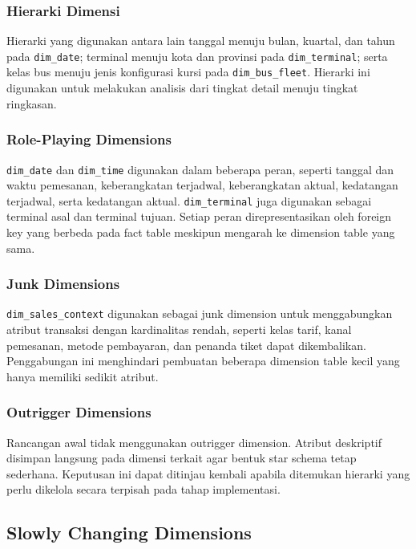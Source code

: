 \subsubsection{Hierarki Dimensi}

Hierarki yang digunakan antara lain tanggal menuju bulan, kuartal, dan tahun pada
\texttt{dim\_date}; terminal menuju kota dan provinsi pada
\texttt{dim\_terminal}; serta kelas bus menuju jenis konfigurasi kursi pada
\texttt{dim\_bus\_fleet}. Hierarki ini digunakan untuk melakukan analisis dari
tingkat detail menuju tingkat ringkasan.

\subsubsection{Role-Playing Dimensions}

\texttt{dim\_date} dan \texttt{dim\_time} digunakan dalam beberapa peran, seperti
tanggal dan waktu pemesanan, keberangkatan terjadwal, keberangkatan aktual,
kedatangan terjadwal, serta kedatangan aktual. \texttt{dim\_terminal} juga digunakan
sebagai terminal asal dan terminal tujuan. Setiap peran direpresentasikan oleh
foreign key yang berbeda pada fact table meskipun mengarah ke dimension table yang
sama.

\subsubsection{Junk Dimensions}

\texttt{dim\_sales\_context} digunakan sebagai junk dimension untuk menggabungkan
atribut transaksi dengan kardinalitas rendah, seperti kelas tarif, kanal pemesanan,
metode pembayaran, dan penanda tiket dapat dikembalikan. Penggabungan ini menghindari
pembuatan beberapa dimension table kecil yang hanya memiliki sedikit atribut.

\subsubsection{Outrigger Dimensions}

Rancangan awal tidak menggunakan outrigger dimension. Atribut deskriptif disimpan
langsung pada dimensi terkait agar bentuk star schema tetap sederhana. Keputusan ini
dapat ditinjau kembali apabila ditemukan hierarki yang perlu dikelola secara
terpisah pada tahap implementasi.

\subsection{Slowly Changing Dimensions}
